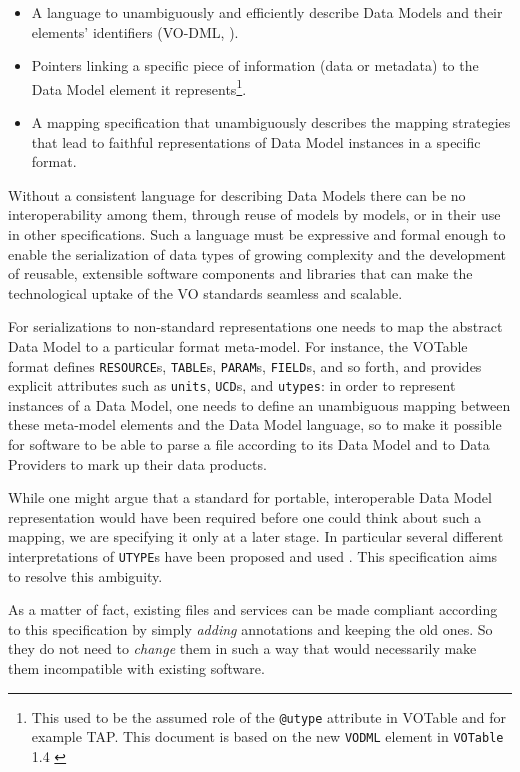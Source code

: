 \documentclass[11pt,a4paper]{ivoa}
\begin{document}
\begin{itemize}
\item
  A language to unambiguously and efficiently describe Data Models and
  their elements' identifiers (VO-DML, \cite{2018ivoa.spec.0910L}).
\item
  Pointers linking a specific piece of information (data or metadata) to
  the Data Model element it represents\footnote{This used to be the
    assumed role of the \texttt{@utype} attribute in VOTable and for
    example TAP. This document is based on the new \texttt{VODML}
    element in \texttt{VOTable} 1.4 \cite{2019ivoa.spec.1021O}}.
\item
  A mapping specification that unambiguously describes the mapping
  strategies that lead to faithful representations of Data Model
  instances in a specific format.
\end{itemize}

Without a consistent language for describing Data Models there can be no
interoperability among them, through reuse of models by models, or in
their use in other specifications. Such a language must be expressive
and formal enough to enable the serialization of data types of growing
complexity and the development of reusable, extensible software
components and libraries that can make the technological uptake of the
VO standards seamless and scalable.

For serializations to non-standard representations one needs to map the
abstract Data Model to a particular format meta-model. For instance, the
VOTable format defines \texttt{RESOURCE}s, \texttt{TABLE}s,
\texttt{PARAM}s, \texttt{FIELD}s, and so forth, and provides explicit
attributes such as \texttt{units}, \texttt{UCD}s, and \texttt{utypes}:
in order to represent instances of a Data Model, one needs to define an
unambiguous mapping between these meta-model elements and the Data Model
language, so to make it possible for software to be able to parse a file
according to its Data Model and to Data Providers to mark up their data
products.

While one might argue that a standard for portable, interoperable Data
Model representation would have been required before one could think
about such a mapping, we are specifying it only at a later stage. In
particular several different interpretations of \texttt{UTYPE}s have
been proposed and used \cite{note:utypeusage}. This specification aims to resolve
this ambiguity.

As a matter of fact, existing files and services can be made compliant
according to this specification by simply \emph{adding} annotations and
keeping the old ones. So they do not need to \emph{change} them in such
a way that would necessarily make them incompatible with existing
software.
\end{document}
